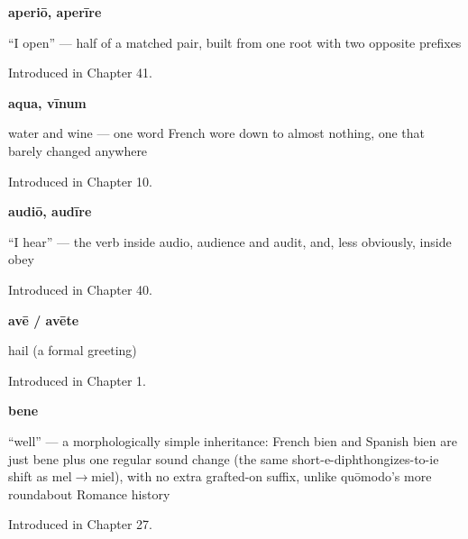 \noindent\begin{minipage}[t]{\linewidth}
\raggedright
\textbf{aperiō, aperīre}\par
\small \textquotedblleft{}I open\textquotedblright{} — half of a matched pair, built from one root with two opposite prefixes\par
\footnotesize Introduced in Chapter 41.
\end{minipage}\par\medskip

\noindent\begin{minipage}[t]{\linewidth}
\raggedright
\textbf{aqua, vīnum}\par
\small water and wine — one word French wore down to almost nothing, one that barely changed anywhere\par
\footnotesize Introduced in Chapter 10.
\end{minipage}\par\medskip

\noindent\begin{minipage}[t]{\linewidth}
\raggedright
\textbf{audiō, audīre}\par
\small \textquotedblleft{}I hear\textquotedblright{} — the verb inside audio, audience and audit, and, less obviously, inside obey\par
\footnotesize Introduced in Chapter 40.
\end{minipage}\par\medskip

\noindent\begin{minipage}[t]{\linewidth}
\raggedright
\textbf{avē / avēte}\par
\small hail (a formal greeting)\par
\footnotesize Introduced in Chapter 1.
\end{minipage}\par\medskip

\noindent\begin{minipage}[t]{\linewidth}
\raggedright
\textbf{bene}\par
\small \textquotedblleft{}well\textquotedblright{} — a morphologically simple inheritance: French bien and Spanish bien are just bene plus one regular sound change (the same short-e-diphthongizes-to-ie shift as mel$\to$miel), with no extra grafted-on suffix, unlike quōmodo's more roundabout Romance history\par
\footnotesize Introduced in Chapter 27.
\end{minipage}\par\medskip

